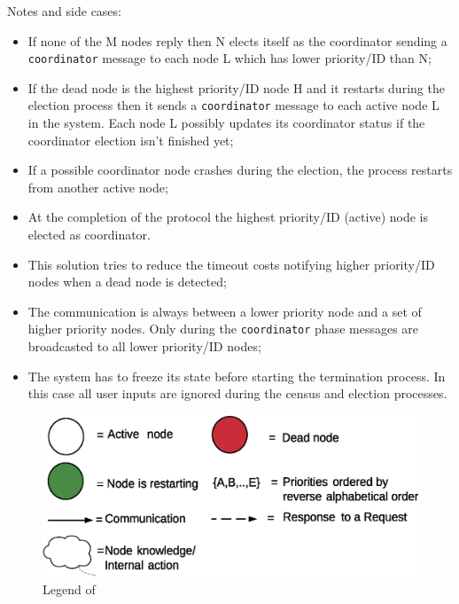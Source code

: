 Notes and side cases:

\begin{itemize}
\item If none of the M nodes reply then N elects itself as the coordinator
  sending a \texttt{coordinator} message to each node L which has lower
  priority/ID than N;
\item If the dead node is the highest priority/ID node H and it restarts
  during the election process then it sends a \texttt{coordinator} message to
  each active node L in the system. Each node L possibly updates its
  coordinator status if the coordinator election isn't finished yet;
\item If a possible coordinator node crashes during the election, the process
  restarts from another active node;
\item At the completion of the protocol the highest priority/ID (active) node
  is elected as coordinator.
\item This solution tries to reduce the timeout costs notifying higher
  priority/ID nodes when a dead node is detected;
\item The communication is always between a lower priority node and a set of
  higher priority nodes. Only during the \texttt{coordinator} phase messages
  are broadcasted to all lower priority/ID nodes;
\item The system has to freeze its state before starting the termination
  process. In this case all user inputs are ignored during the census and
  election processes.
\end{itemize}


\begin{figure}[H]
  \centering
  \includegraphics[width=.6\columnwidth]{images/solution/election_legend.eps}
  \caption{Legend of }
  \label{fig:election-protocol-legend}
\end{figure}

